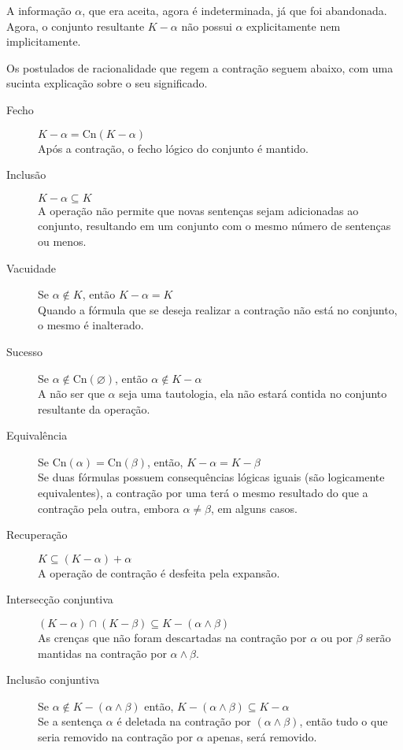 A informação $ \alpha $, que era aceita, agora é indeterminada, já que foi abandonada. Agora, o conjunto resultante $ K - \alpha $ não possui $ \alpha $ explicitamente nem implicitamente. 

Os postulados de racionalidade que regem a contração seguem abaixo, com uma sucinta explicação sobre o seu significado.

\begin{description}
	\item[Fecho] $ K - \alpha = \text{Cn}(K - \alpha) $ \\ Após a contração, o fecho lógico do conjunto é mantido.
	\item[Inclusão] $ K - \alpha \subseteq K$ \\ A operação não permite que novas sentenças sejam adicionadas ao conjunto, resultando em um conjunto com o mesmo número de sentenças ou menos.
	\item[Vacuidade] Se $ \alpha \notin K $, então $ K - \alpha = K $ \\ Quando a fórmula que se deseja realizar a contração não está no conjunto, o mesmo é inalterado.
	\item[Sucesso] Se $ \alpha \notin \text{Cn}(\varnothing) $, então $ \alpha \notin K - \alpha $ \\ A não ser que $ \alpha $ seja uma tautologia, ela não estará contida no conjunto resultante da operação.
	\item[Equivalência] Se $ \text{Cn}(\alpha) = \text{Cn}(\beta) $, então, $ K - \alpha = K - \beta $ \\ Se duas fórmulas possuem consequências lógicas iguais (são logicamente equivalentes), a contração por uma terá o mesmo resultado do que a contração pela outra, embora $ \alpha \neq \beta $, em alguns casos.
	\item[Recuperação] $ K \subseteq (K - \alpha) + \alpha $ \\ A operação de contração é desfeita pela expansão.
	\item[Intersecção conjuntiva] $ (K - \alpha) \cap (K - \beta) \subseteq K - (\alpha \land \beta) $ \\ As crenças que não foram descartadas na contração por $ \alpha $ ou por $ \beta $ serão mantidas na contração por $ \alpha \land \beta $.
	\item[Inclusão conjuntiva] Se $ \alpha \notin K - (\alpha \land \beta) $ então, $ K - (\alpha \land \beta) \subseteq K - \alpha $ \\ Se a sentença $ \alpha $ é deletada na contração por $  (\alpha \land \beta) $, então tudo o que seria removido na contração por $ \alpha $ apenas, será removido. 
\end{description}

